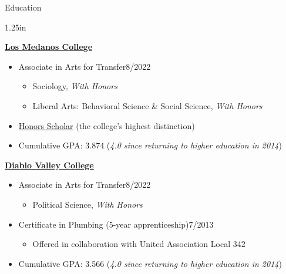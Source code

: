 \documentclass[12pt]{resume} %
\newcommand{\righthandindent}{1.25in}
\begin{document}
\begin{rSection}{Education}
\begin{adjustwidth}{0pt}{0pt}
\begin{adjustwidth}{0pt}{\righthandindent}
\begin{itemize}
\end{itemize}
\end{adjustwidth}

    \textbf{\href{https://www.losmedanos.edu/}{Los Medanos College}}
\vspace{-7pt}
\begin{itemize}
    \item[] Associate in Arts for Transfer\hfill{}8/2022 
\begin{itemize}
    \vspace{-7pt}
    \item[] Sociology, \textit{With Honors}
    \vspace{-7pt}
    \item[] Liberal Arts: Behavioral Science \& Social Science, \textit{With Honors}
    \end{itemize}
\end{itemize}
\begin{itemize}
    \item[] \href{https://www.losmedanos.edu/honors/prog.aspx\#:~:text=Honors\%20Scholar\%20Requirements}{Honors Scholar} (the college’s highest distinction)
    \vspace{-7pt}
    \item[] Cumulative GPA: 3.874 (\textit{4.0 since returning to higher education in 2014})
\end{itemize}

    \textbf{\href{https://www.dvc.edu/}{Diablo Valley College}}
    \vspace{-7pt}
    \begin{itemize}
        \item[] Associate in Arts for Transfer\hfill{}8/2022
        \begin{itemize}
        \vspace{-7pt}
        \item[] Political Science, \textit{With Honors}
        \end{itemize}
\end{itemize}

\begin{itemize}
        \item[] Certificate in Plumbing (5-year apprenticeship)\hfill{}7/2013
        \begin{itemize}
        \vspace{-7pt}
        \item[] Offered in collaboration with United Association Local 342
        \end{itemize}
        \item[] Cumulative GPA: 3.566 (\textit{4.0 since returning to higher education in 2014}) 
    \end{itemize}
\end{adjustwidth}
\end{rSection}
\end{document}
